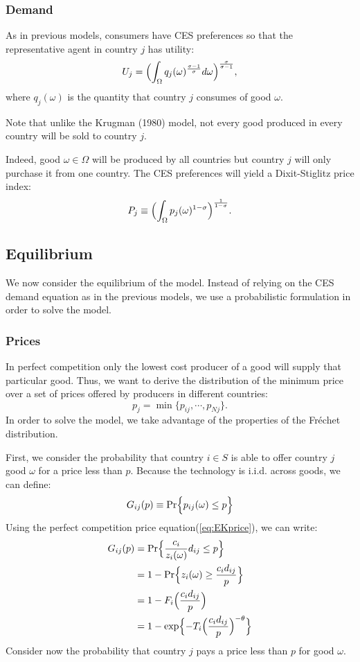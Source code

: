 \subsubsection{Demand}

As in previous models, consumers have CES preferences so that the representative agent
in country $j$ has utility:
\[
U_j = \Bigl( \int_{\Omega} q_j(\omega)^{\frac{\sigma -1}{\sigma}} d \omega \Bigr)^{\frac{\sigma}{\sigma-1}},
\]
where $q_j(\omega)$ is the quantity that country $j$ consumes of good $\omega$.

Note that unlike the Krugman (1980)\cite{krugman1980scale} model, not every good produced in every country will be sold to country $j$.

Indeed, good $\omega \in \Omega$ will be produced by all countries but country $j$ will only purchase
it from one country. The CES preferences will yield a Dixit-Stiglitz price index:
\[
P_j \equiv \Bigl( \int_{\Omega} p_j(\omega)^{1-\sigma} \Bigr)^{\frac{1}{1-\sigma}}.
\]

\subsection{Equilibrium}

We now consider the equilibrium of the model. Instead of relying on the CES demand
equation as in the previous models, we use a probabilistic formulation in order to solve
the model.

\subsubsection{Prices}

In perfect competition only the lowest cost producer of a good will supply that particular
good. Thus, we want to derive the distribution of the minimum price over a set of prices
offered by producers in different countries:
\[
p_j = \min \{p_{ij}, \cdots, p_{Nj} \}.
\]
In order to solve the model, we take advantage of the properties of the Fréchet distribution.

First, we consider the probability that country $i \in S$ is able to offer country $j$ good $\omega$
for a price less than $p$. Because the technology is i.i.d. across goods, we can define:
\begin{gather*}
    G_{ij}(p) \equiv \operatorname{Pr} \Bigl\{ p_{ij}(\omega) \leq p \Bigr\}
\end{gather*}
Using the perfect competition price equation(\ref{eq:EKprice}), we can write:
\begin{align*}
    G_{ij}(p) &= \operatorname{Pr} \Bigl\{ \frac{c_i}{z_i(\omega)} d_{ij} \leq p \Bigr\} \\
    &= 1 - \operatorname{Pr} \Bigl\{ z_i(\omega) \geq \frac{c_i d_{ij}}{p} \Bigr\} \\
    &= 1 - F_i \Bigl( \frac{c_i d_{ij}}{p} \Bigr) \\
    &= 1 - \exp \Bigl\{ -T_i \Bigl( \frac{c_i d_{ij}}{p} \Bigr)^{-\theta} \Bigr\}
\end{align*}
Consider now the probability that country $j$ pays a price less than $p$ for good $\omega $.

